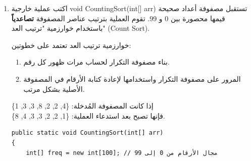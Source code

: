 \documentclass[14pt]{extarticle}
\begin{document}
\begin{enumerate}[itemsep=2em]
    \ifwithsols
    \begin{boxSolution}
    \begin{english}
    \begin{verbatim}
public static bool HasDuplicates(int[] arr, int maxVal)
{
    bool[] seen = new bool[maxVal + 1];
    for (int i = 0; i < arr.Length; i++)
    {
        if (seen[arr[i]] == true) // إذا رأينا الرقم مسبقاً
            return true;

        seen[arr[i]] = true; // نسجل رؤيتنا للرقم
    }
    return false; // إذا انتهت الحلقة ولم نجد تكراراً
}
    \end{verbatim}
    \end{english}
    \end{boxSolution}
    \fi
    \clearpage


    \item
    اكتب عملية خارجية \textenglish{void CountingSort(int[] arr)} تستقبل مصفوفة أعداد صحيحة قيمها محصورة بين 0 و 99. تقوم العملية بترتيب عناصر المصفوفة \textbf{تصاعدياً} باستخدام خوارزمية "ترتيب العد" (\textenglish{Count Sort}).

    \begin{boxHint}
    خوارزمية ترتيب العد تعتمد على خطوتين:
    \begin{enumerate}
        \item بناء مصفوفة التكرار لحساب مرات ظهور كل رقم.
        \item المرور على مصفوفة التكرار واستخدامها لإعادة كتابة الأرقام في المصفوفة الأصلية بشكل مرتب.
    \end{enumerate}
    \end{boxHint}

    \begin{boxExample}
    إذا كانت المصفوفة المُدخلة: \textenglish{\{4, 2, 2, 8, 3, 3, 1\}} \\
    فإنها تصبح بعد استدعاء العملية: \textenglish{\{1, 2, 2, 3, 3, 4, 8\}}.
    \end{boxExample}

    \ifwithsols
    \begin{boxSolution}
    \begin{english}
    \begin{verbatim}
public static void CountingSort(int[] arr)
{
    int[] freq = new int[100]; // مجال الأرقام من 0 إلى 99


\end{verbatim}
\end{english}
\end{boxSolution}
\end{enumerate}
\end{document}
